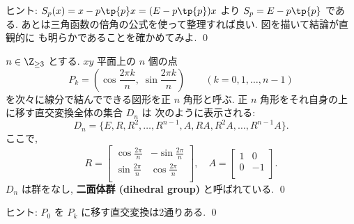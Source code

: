 \documentclass[12pt,twoside]{jarticle}
\begin{document}
\noindent
ヒント: $S_p(x)=x - p\tp{p}x = (E-p\tp{p})x$ より $S_p=E-p\tp{p}$ である.
あとは三角函数の倍角の公式を使って整理すれば良い.  図を描いて結論が直観的に
も明らかであることを確かめてみよ.
\qed


\begin{question}[二面体群]
\label{q:dihedral-1}
  $n\in\Z_{\ge 3}$ とする.  $xy$ 平面上の $n$ 個の点
  \begin{equation*}
    P_k=\left(\cos\frac{2\pi k}{n},\;\sin\frac{2\pi k}{n}\right)
    \qquad
    (k=0,1,\dots,n-1)
  \end{equation*}
  を次々に線分で結んでできる図形を正 $n$ 角形と呼ぶ.
  正 $n$ 角形をそれ自身の上に移す直交変換全体の集合 $D_n$ は
  次のように表示される:
  \begin{equation*}
    D_n = \{E,R,R^2,\dots,R^{n-1},A,RA,R^2A,\dots,R^{n-1}A\}.
  \end{equation*}
  ここで,
  \begin{equation*}
    R =
    \begin{bmatrix}
      \cos\frac{2\pi}{n} & -\sin\frac{2\pi}{n} \\
      \sin\frac{2\pi}{n} &  \cos\frac{2\pi}{n} \\
    \end{bmatrix}, 
    \quad
    A =
    \begin{bmatrix}
      1 &  0 \\
      0 & -1 \\
    \end{bmatrix}.
  \end{equation*}
  $D_n$ は群をなし, {\bf 二面体群 (dihedral group)} と呼ばれている. \qed
\end{question}

\noindent
ヒント: $P_0$ を $P_k$ に移す直交変換は2通りある.
\qed

\end{document}
